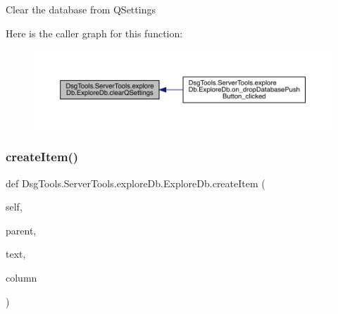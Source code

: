 \begin{DoxyVerb}Clear the database from QSettings
\end{DoxyVerb}
 Here is the caller graph for this function\+:
\nopagebreak
\begin{figure}[H]
\begin{center}
\leavevmode
\includegraphics[width=350pt]{class_dsg_tools_1_1_server_tools_1_1explore_db_1_1_explore_db_a2f5bb5f62f93bc8eeaf4201934cba182_icgraph}
\end{center}
\end{figure}
\mbox{\label{class_dsg_tools_1_1_server_tools_1_1explore_db_1_1_explore_db_a526574416eadb2311ed5ce6fccced60e}} 
\subsubsection{\texorpdfstring{create\+Item()}{createItem()}}
{\footnotesize\ttfamily def Dsg\+Tools.\+Server\+Tools.\+explore\+Db.\+Explore\+Db.\+create\+Item (\begin{DoxyParamCaption}\item[{}]{self,  }\item[{}]{parent,  }\item[{}]{text,  }\item[{}]{column }\end{DoxyParamCaption})}

